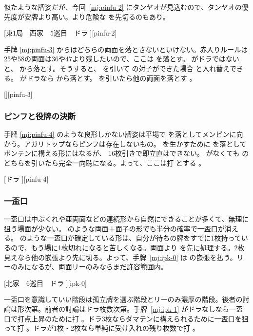 \documentclass[../nankiru_main.tex]{subfiles}
\begin{document}
似たような牌姿だが、今回~\ref{mj:pinfu-2} にタンヤオが見込むので、タンヤオの優先度が安牌より高い。より危険な  を先切るのもあり。

[東1局　西家　5巡目　ドラ ][pinfu-2]

手牌 \ref{mj:pinfu-3} からはどちらの両面を落とさないといけない。赤入りルールは25や58の両面は36や47より残したいので、ここは  を落とす。 がドラではないと、 から落とす。そうすると、 を引いて  の対子ができた場合  と入れ替えできる。 がドラなら  から落とす。 を引いたら他の両面を落とす \citep[][pp.~13--14]{kawamura-naki}。

[][pinfu-3]


\subsubsection*{ピンフと役牌の決断}

手牌 \ref{mj:pinfu-4} のような良形しかない牌姿は平場で  を落としてメンピンに向かう。アガリトップならピンフは存在しないもの。 を生かすために  を落としてポンテンに構える形にはなるが、 16枚引きで即立直はできない。 がなくても  のどちらを引いたら完全一向聴になる。よって、ここは打  とする \citep[][pp.~179--180]{kawamura-naki}。

[ドラ ][pinfu-4]


\subsubsection{一盃口}

一盃口は中ぶくれや亜両面などの連続形から自然にできることが多くて、無理に狙う場面が少ない。 のような両面＋面子の形でも半分の確率で一盃口が消える。 のような一盃口が確定している形は、自分が待ちの牌をすでに1枚持っているので、もう場に1枚切れになると苦しくなる。両面より  を先に処理する。2枚見えなら他の嵌張より先に切る\citep{gendai-ipk}。よって、手牌~\ref{mj:ipk-0} は  の嵌張を払う。リーのみになるが、両面リーのみならまだ許容範囲内\citep[][pp.~121--122]{ooi-gundou}。

[北家　6巡目　ドラ ][ipk-0]

一盃口を意識していい階段は孤立牌を選ぶ階段とリーのみ濃厚の階段。後者の討論は形次第。前者の討論はドラ枚数次第。手牌~\ref{mj:ipk-1} がドラなしなら一盃口で打点上昇のために打 。ドラ3枚ならダマテンに構えられるために一盃口を狙って打 。ドラが1枚・2枚なら単純に受け入れの残り枚数で打  \citep[][p.~32]{zero-teyaku}。
\end{document}
